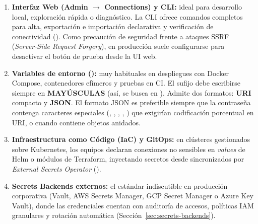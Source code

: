\begin{enumerate}
  \item \textbf{Interfaz Web (Admin $\rightarrow$ Connections) y CLI:} ideal para desarrollo local, exploración rápida o diagnóstico. La CLI ofrece comandos completos para alta, exportación e importación declarativa y verificación de conectividad (). Como precaución de seguridad frente a ataques SSRF (\textit{Server-Side Request Forgery}), en producción suele configurarse  para desactivar el botón de prueba desde la UI web.
  \item \textbf{Variables de entorno ():} muy habituales en despliegues con Docker Compose, contenedores efímeros y pruebas en CI. El sufijo  debe escribirse siempre en \textbf{MAYÚSCULAS} (así,  se busca en ). Admite dos formatos: \textbf{URI} compacto y \textbf{JSON}. El formato JSON es preferible siempre que la contraseña contenga caracteres especiales (, \code{/}, , \code{\%}, \code{\#}) que exigirían codificación porcentual en URI, o cuando  contiene objetos anidados.
  \item \textbf{Infraestructura como Código (IaC) y GitOps:} en clústeres gestionados sobre Kubernetes, los equipos declaran conexiones no sensibles en \textit{values} de Helm o módulos de Terraform, inyectando secretos desde  sincronizados por \textit{External Secrets Operator} ().
  \item \textbf{Secrets Backends externos:} el estándar indiscutible en producción corporativa (Vault, AWS Secrets Manager, GCP Secret Manager o Azure Key Vault), donde las credenciales cuentan con auditoría de accesos, políticas IAM granulares y rotación automática (Sección~\ref{sec:secrets-backends}).
\end{enumerate}

